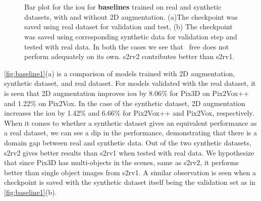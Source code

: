 

\begin{figure}[!ht]
    \centering
    \subfloat[][]{\resizebox{0.75\linewidth}{!}{}}\\
    \subfloat[][]{\resizebox{0.75\linewidth}{!}{}}\\
    \caption[\gls{iou} Comparison for Baselines.]{Bar plot for the \gls{iou}  for \textbf{baselines} trained on real and synthetic datasets, with and without 2D augmentation.
        (a)The checkpoint was saved using real dataset for validation and test, (b) The checkpoint was saved using corresponding synthetic data for validation step and tested with real data.
        In both the cases we see that ~\gls{free} does not perform adequately on its own. \gls{s2rv2} contributes better than \gls{s2rv1}.}
    \label{fig:baseline1}
\end{figure}

\autoref{fig:baseline1}(a) is a comparison of models trained with 2D augmentation, synthetic dataset, and real dataset.
For models validated with the real dataset, it is seen that 2D augmentation improves \gls{iou}  by 8.06\% for Pix3D on Pix2Vox++ and 1.22\% on Pix2Vox.
In the case of the synthetic dataset, 2D augmentation increases the \gls{iou}  by 1.42\% and 6.66\% for Pix2Vox++ and Pix2Vox, respectively.
When it comes to whether a synthetic dataset gives an equivalent performance as a real dataset, we can see a dip in the performance, demonstrating that there is a domain gap between real and synthetic data.
Out of the two synthetic datasets, \gls{s2rv2} gives better results than \gls{s2rv1} when tested with real data.
We hypothesize that since Pix3D has multi-objects in the scenes, same as \gls{s2rv2}, it performs better than single object images from \gls{s2rv1}.
A similar observation is seen when a checkpoint is saved with the synthetic dataset itself being the validation set as in \autoref{fig:baseline1}(b).

